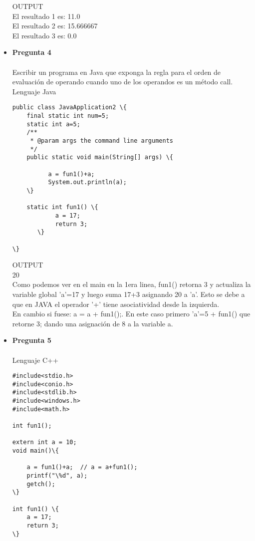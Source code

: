 \documentclass[12pt,oneside]{article}
\begin{document}
\begin{itemize}
OUTPUT\\
El resultado 1 es: 11.0\\
El resultado 2 es: 15.666667\\
El resultado 3 es: 0.0\\

\item {\bf Pregunta 4} \\\\
Escribir un programa en Java que exponga la regla para el orden de evaluación de operando cuando uno de los operandos es un método call.\\
Lenguaje Java\\
\begin{lstlisting}[frame=single]  % Start your code-block
public class JavaApplication2 \{
    final static int num=5;
    static int a=5;
    /**
     * @param args the command line arguments
     */
    public static void main(String[] args) \{
        
          a = fun1()+a; 
          System.out.println(a); 
    \}

    static int fun1() \{
            a = 17;
            return 3;
       \}

\}

\end{lstlisting}
OUTPUT\\
20\\
Como podemos ver en el main en la 1era linea, fun1() retorna 3 y actualiza la variable global 'a'=17 y luego suma 17+3 asignando 20 a 'a'. Esto se debe a que en JAVA el operador '+' tiene asociatividad desde la izquierda.\\
En cambio si fuese:  a = a + fun1();. En este caso primero 'a'=5 + fun1() que retorne 3; dando una asignación de 8 a la variable a.

\item {\bf Pregunta 5} \\\\
Lenguaje C++
\begin{lstlisting}[frame=single]  % Start your code-block
#include<stdio.h>
#include<conio.h>
#include<stdlib.h>
#include<windows.h>
#include<math.h>

int fun1();

extern int a = 10;
void main()\{
	
	a = fun1()+a;  // a = a+fun1();
	printf("\%d", a);
	getch();
\}

int fun1() \{
	a = 17;
	return 3;
\}
\end{lstlisting}


\end{itemize}
\end{document}
